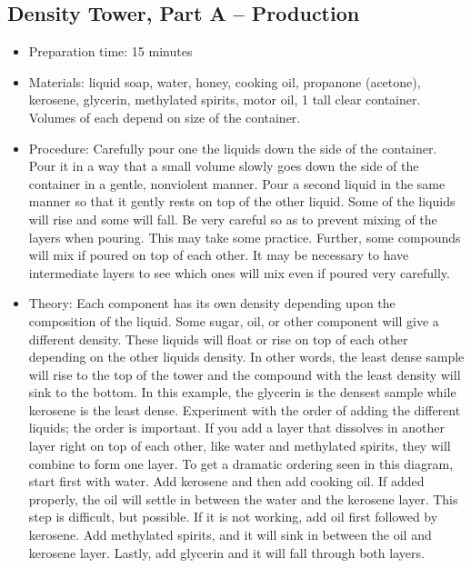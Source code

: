 \subsection{Density Tower, Part A -- Production}
\begin{itemize}
\item{Preparation time: 15 minutes}
\item{Materials: liquid soap, water, honey, cooking oil, propanone (acetone), kerosene, glycerin, methylated spirits, motor oil, 1 tall clear container. Volumes of each depend on size of the container.}
\item{Procedure: Carefully pour one the liquids down the side of the container. Pour it in a way that a small volume slowly goes down the side of the container in a gentle, nonviolent manner. Pour a second liquid in the same manner so that it gently rests on top of the other liquid. Some of the liquids will rise and some will fall. Be very careful so as to prevent mixing of the layers when pouring. This may take some practice. Further, some compounds will mix if poured on top of each other. It may be necessary to have intermediate layers to see which ones will mix even if poured very carefully.}
\item{Theory: Each component has its own density depending upon the composition of the liquid. Some sugar, oil, or other component will give a different density. These liquids will float or rise on top of each other depending on the other liquids density. In other words, the least dense sample will rise to the top of the tower and the compound with the least density will sink to the bottom. In this example, the glycerin is the densest sample while kerosene is the least dense. Experiment with the order of adding the different liquids; the order is important. If you add a layer that dissolves in another layer right on top of each other, like water and methylated spirits, they will combine to form one layer. To get a dramatic ordering seen in this diagram, start first with water. Add kerosene and then add cooking oil. If added properly, the oil will settle in between the water and the kerosene layer. This step is difficult, but possible. If it is not working, add oil first followed by kerosene. Add methylated spirits, and it will sink in between the oil and kerosene layer. Lastly, add glycerin and it will fall through both layers.}
\end{itemize}


